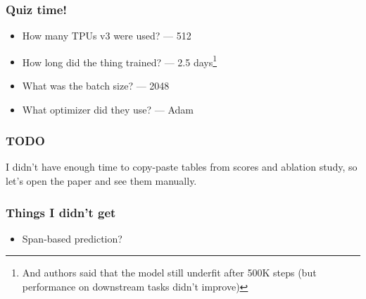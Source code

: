 \documentclass[10pt]{beamer}
\begin{document}
\begin{frame}
    \frametitle{Quiz time!}
    \begin{itemize}
        \item\pause How many TPUs v3 were used? \pause --- 512
        \item\pause How long did the thing trained? \pause --- 2.5 days\footnote{And authors said that the model still underfit after 500K steps (but performance on downstream tasks didn't improve)}
        \item\pause What was the batch size? \pause --- 2048
        \item\pause What optimizer did they use? \pause --- Adam
    \end{itemize}
\end{frame}

\begin{frame}
    \frametitle{TODO}
I didn't have enough time to copy-paste tables from scores and ablation study, so let's open the paper and see them manually.
\end{frame}

\begin{frame}
    \frametitle{Things I didn't get}
    \begin{itemize}
        \item Span-based prediction?
    \end{itemize}
\end{frame}
\end{document}
